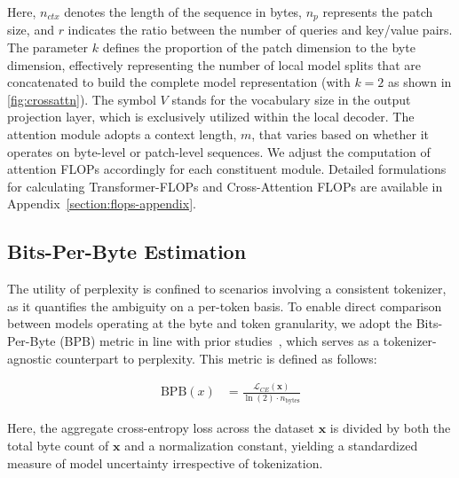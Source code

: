 Here, $n_{ctx}$ denotes the length of the sequence in bytes, $n_p$ represents the patch size, and $r$ indicates the ratio between the number of queries and key/value pairs. The parameter $k$ defines the proportion of the patch dimension to the byte dimension, effectively representing the number of local model splits that are concatenated to build the complete model representation (with $k=2$ as shown in \autoref{fig:crossattn}). The symbol $V$ stands for the vocabulary size in the output projection layer, which is exclusively utilized within the local decoder. The attention module adopts a context length, $m$, that varies based on whether it operates on byte-level or patch-level sequences. We adjust the computation of attention FLOPs accordingly for each constituent module. Detailed formulations for calculating Transformer-FLOPs and Cross-Attention FLOPs are available in Appendix~\ref{section:flops-appendix}.

\subsection{Bits-Per-Byte Estimation} The utility of perplexity is confined to scenarios involving a consistent tokenizer, as it quantifies the ambiguity on a per-token basis. To enable direct comparison between models operating at the byte and token granularity, we adopt the Bits-Per-Byte (BPB) metric in line with prior studies~\citep{xue2022byt5, yu2023megabyte, wang2024mambabyte}, which serves as a tokenizer-agnostic counterpart to perplexity. This metric is defined as follows:

\begin{align}
    \text{BPB}(x)&= \frac{\mathcal{L}_{CE}(\pmb{x})}{\ln(2)\cdot n_{\text{bytes}}}
\end{align}

Here, the aggregate cross-entropy loss across the dataset $\pmb{x}$ is divided by both the total byte count of $\pmb{x}$ and a normalization constant, yielding a standardized measure of model uncertainty irrespective of tokenization.

